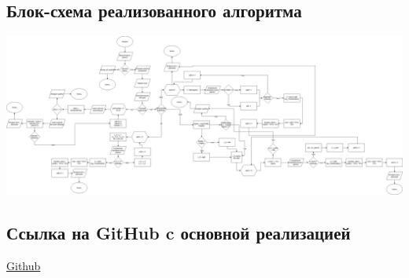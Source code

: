 \documentclass{article}
\begin{document}
      \subsection{Блок-схема реализованного алгоритма}
            \includegraphics[scale=0.15]{НУиСНУ.png}
      \subsection{Ссылка на GitHub c основной реализацией}
            \href{https://github.com/isofinly/compmath}{Github}
\end{document}
